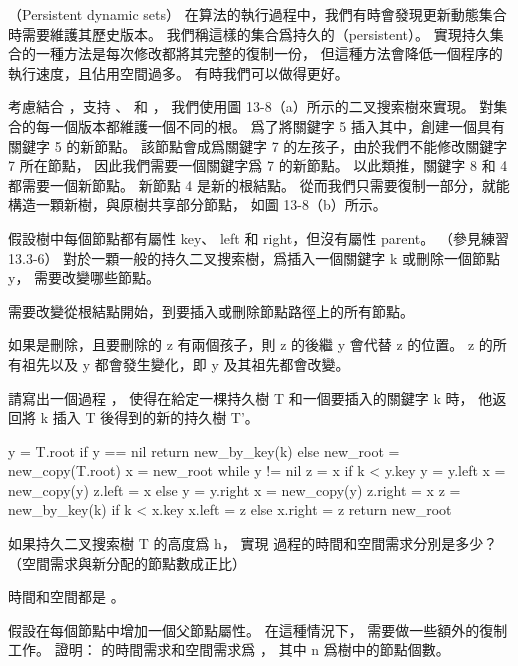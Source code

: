\startsubject[
  title={Problems},
]

\startPROBLEM
（Persistent dynamic sets）
在算法的執行過程中，我們有時會發現更新動態集合時需要維護其歷史版本。
我們稱這樣的集合爲{\EMP 持久的（persistent）}。
實現持久集合的一種方法是每次修改都將其完整的復制一份，
但這種方法會降低一個程序的執行速度，且佔用空間過多。
有時我們可以做得更好。

考慮結合 ，支持 、  和 ，
我們使用圖 13-8（a）所示的二叉搜索樹來實現。
對集合的每一個版本都維護一個不同的根。
爲了將關鍵字 5 插入其中，創建一個具有關鍵字 5 的新節點。
該節點會成爲關鍵字 7 的左孩子，由於我們不能修改關鍵字 7 所在節點，
因此我們需要一個關鍵字爲 7 的新節點。
以此類推，關鍵字 8 和 4 都需要一個新節點。
新節點 4 是新的根結點。
從而我們只需要復制一部分，就能構造一顆新樹，與原樹共享部分節點，
如圖 13-8（b）所示。

假設樹中每個節點都有屬性 key、 left 和 right，但沒有屬性 parent。
（參見練習 13.3-6）
\startigBase[a]
\startitem%
對於一顆一般的持久二叉搜索樹，爲插入一個關鍵字 k 或刪除一個節點 y，
需要改變哪些節點。
\stopitem

\startANSWER
需要改變從根結點開始，到要插入或刪除節點路徑上的所有節點。

如果是刪除，且要刪除的 z 有兩個孩子，則 z 的後繼 y 會代替 z 的位置。
 z 的所有祖先以及 y 都會發生變化，即 y 及其祖先都會改變。
\stopANSWER

\startitem%
請寫出一個過程 ，
使得在給定一棵持久樹 T 和一個要插入的關鍵字 k 時，
他返回將 k 插入 T 後得到的新的持久樹 T'。
\stopitem

\startANSWER
{}
\startCLRS
y = T.root
if y == nil
	return new_by_key(k)
else
	new_root = new_copy(T.root)
	x = new_root
	while y != nil
		z = x
		if k < y.key
			y = y.left
			x = new_copy(y)
			z.left = x
		else
			y = y.right
			x = new_copy(y)
			z.right = x
			z = new_by_key(k)
			if k < x.key
				x.left = z
			else
				x.right = z
	return new_root
\stopCLRS
\stopANSWER

\startitem%
如果持久二叉搜索樹 T 的高度爲 h，
實現  過程的時間和空間需求分別是多少？
（空間需求與新分配的節點數成正比）
\stopitem

\startANSWER
時間和空間都是 。
\stopANSWER

\startitem%
假設在每個節點中增加一個父節點屬性。
在這種情況下，  需要做一些額外的復制工作。
證明：  的時間需求和空間需求爲 ，
其中 n 爲樹中的節點個數。
\stopitem

